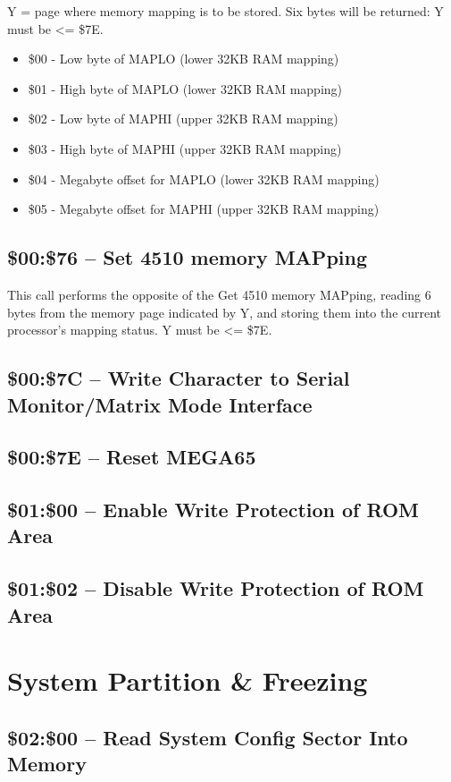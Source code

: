 Y = page where memory mapping is to be stored.  Six bytes will be returned:
Y must be <= \$7E.

\begin{itemize}
  \item \$00 - Low byte of MAPLO (lower 32KB RAM mapping)
  \item \$01 - High byte of MAPLO (lower 32KB RAM mapping)
  \item \$02 - Low byte of MAPHI (upper 32KB RAM mapping)
  \item \$03 - High byte of MAPHI (upper 32KB RAM mapping)
  \item \$04 - Megabyte offset for MAPLO (lower 32KB RAM mapping)
  \item \$05 - Megabyte offset for MAPHI (upper 32KB RAM mapping)
\end{itemize}

\subsection{\$00:\$76 -- Set 4510 memory MAPping}

This call performs the opposite of the Get 4510 memory MAPping, reading 6 bytes
from the memory page indicated by Y, and storing them into the current processor's mapping status.
Y must be <= \$7E.

\subsection{\$00:\$7C -- Write Character to Serial Monitor/Matrix Mode Interface}
\subsection{\$00:\$7E -- Reset MEGA65}

\subsection{\$01:\$00 -- Enable Write Protection of ROM Area}
\subsection{\$01:\$02 -- Disable Write Protection of ROM Area}

\section{System Partition \& Freezing}

\subsection{\$02:\$00 -- Read System Config Sector Into Memory}
